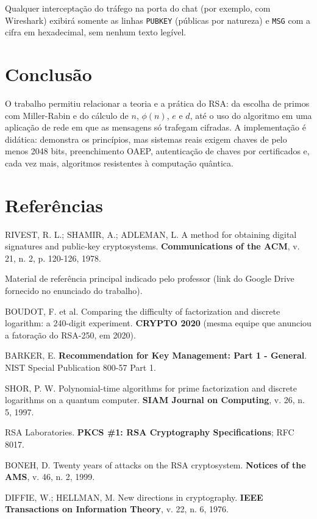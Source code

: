 \documentclass[11pt, a4paper]{article}
\begin{document}
Qualquer interceptação do tráfego na porta do chat (por exemplo, com Wireshark) exibirá somente as linhas \texttt{PUBKEY} (públicas por natureza) e \texttt{MSG} com a cifra em hexadecimal, sem nenhum texto legível.

\section{Conclusão}
O trabalho permitiu relacionar a teoria e a prática do RSA: da escolha de primos com Miller-Rabin e do cálculo de $n$, $\phi(n)$, $e$ e $d$, até o uso do algoritmo em uma aplicação de rede em que as mensagens só trafegam cifradas. A implementação é didática: demonstra os princípios, mas sistemas reais exigem chaves de pelo menos 2048 bits, preenchimento OAEP, autenticação de chaves por certificados e, cada vez mais, algoritmos resistentes à computação quântica.

\section*{Referências}
\begin{enumerate}[label={[\arabic*]}, leftmargin=*]
    \item RIVEST, R. L.; SHAMIR, A.; ADLEMAN, L. A method for obtaining digital signatures and public-key cryptosystems. \textbf{Communications of the ACM}, v. 21, n. 2, p. 120-126, 1978.
    \item Material de referência principal indicado pelo professor (link do Google Drive fornecido no enunciado do trabalho).
    \item BOUDOT, F. et al. Comparing the difficulty of factorization and discrete logarithm: a 240-digit experiment. \textbf{CRYPTO 2020} (mesma equipe que anunciou a fatoração do RSA-250, em 2020).
    \item BARKER, E. \textbf{Recommendation for Key Management: Part 1 - General}. NIST Special Publication 800-57 Part 1.
    \item SHOR, P. W. Polynomial-time algorithms for prime factorization and discrete logarithms on a quantum computer. \textbf{SIAM Journal on Computing}, v. 26, n. 5, 1997.
    \item RSA Laboratories. \textbf{PKCS \#1: RSA Cryptography Specifications}; RFC 8017.
    \item BONEH, D. Twenty years of attacks on the RSA cryptosystem. \textbf{Notices of the AMS}, v. 46, n. 2, 1999.
    \item DIFFIE, W.; HELLMAN, M. New directions in cryptography. \textbf{IEEE Transactions on Information Theory}, v. 22, n. 6, 1976.
\end{enumerate}
\end{document}
